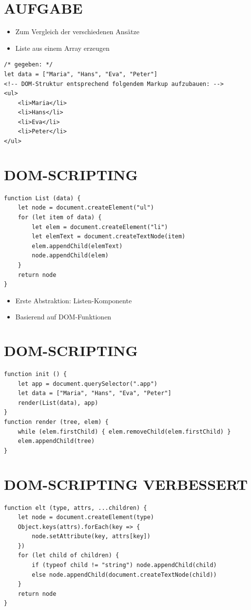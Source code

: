 \section*{AUFGABE}
\begin{itemize}
  \item Zum Vergleich der verschiedenen Ansätze
  \item Liste aus einem Array erzeugen
\end{itemize}

\begin{verbatim}
/* gegeben: */
let data = ["Maria", "Hans", "Eva", "Peter"]
<!-- DOM-Struktur entsprechend folgendem Markup aufzubauen: -->
<ul>
    <li>Maria</li>
    <li>Hans</li>
    <li>Eva</li>
    <li>Peter</li>
</ul>
\end{verbatim}

\section*{DOM-SCRIPTING}
\begin{verbatim}
function List (data) {
    let node = document.createElement("ul")
    for (let item of data) {
        let elem = document.createElement("li")
        let elemText = document.createTextNode(item)
        elem.appendChild(elemText)
        node.appendChild(elem)
    }
    return node
}
\end{verbatim}

\begin{itemize}
  \item Erste Abstraktion: Listen-Komponente
  \item Basierend auf DOM-Funktionen
\end{itemize}

\section*{DOM-SCRIPTING}
\begin{verbatim}
function init () {
    let app = document.querySelector(".app")
    let data = ["Maria", "Hans", "Eva", "Peter"]
    render(List(data), app)
}
function render (tree, elem) {
    while (elem.firstChild) { elem.removeChild(elem.firstChild) }
    elem.appendChild(tree)
}
\end{verbatim}

\section*{DOM-SCRIPTING VERBESSERT}
\begin{verbatim}
function elt (type, attrs, ...children) {
    let node = document.createElement(type)
    Object.keys(attrs).forEach(key => {
        node.setAttribute(key, attrs[key])
    })
    for (let child of children) {
        if (typeof child != "string") node.appendChild(child)
        else node.appendChild(document.createTextNode(child))
    }
    return node
}
\end{verbatim}

